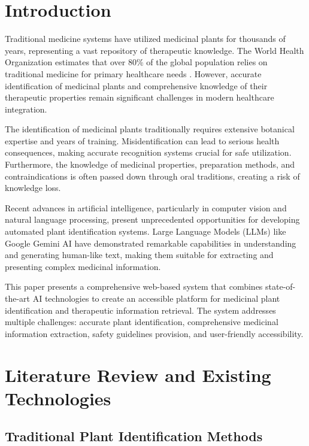 \documentclass[conference]{IEEEtran}
\begin{document}
\section{Introduction}

Traditional medicine systems have utilized medicinal plants for thousands of years, representing a vast repository of therapeutic knowledge. The World Health Organization estimates that over 80\% of the global population relies on traditional medicine for primary healthcare needs \cite{WHO2019}. However, accurate identification of medicinal plants and comprehensive knowledge of their therapeutic properties remain significant challenges in modern healthcare integration.

The identification of medicinal plants traditionally requires extensive botanical expertise and years of training. Misidentification can lead to serious health consequences, making accurate recognition systems crucial for safe utilization. Furthermore, the knowledge of medicinal properties, preparation methods, and contraindications is often passed down through oral traditions, creating a risk of knowledge loss.

Recent advances in artificial intelligence, particularly in computer vision and natural language processing, present unprecedented opportunities for developing automated plant identification systems. Large Language Models (LLMs) like Google Gemini AI have demonstrated remarkable capabilities in understanding and generating human-like text, making them suitable for extracting and presenting complex medicinal information.

This paper presents a comprehensive web-based system that combines state-of-the-art AI technologies to create an accessible platform for medicinal plant identification and therapeutic information retrieval. The system addresses multiple challenges: accurate plant identification, comprehensive medicinal information extraction, safety guidelines provision, and user-friendly accessibility.

\section{Literature Review and Existing Technologies}

\subsection{Traditional Plant Identification Methods}
\end{document}
